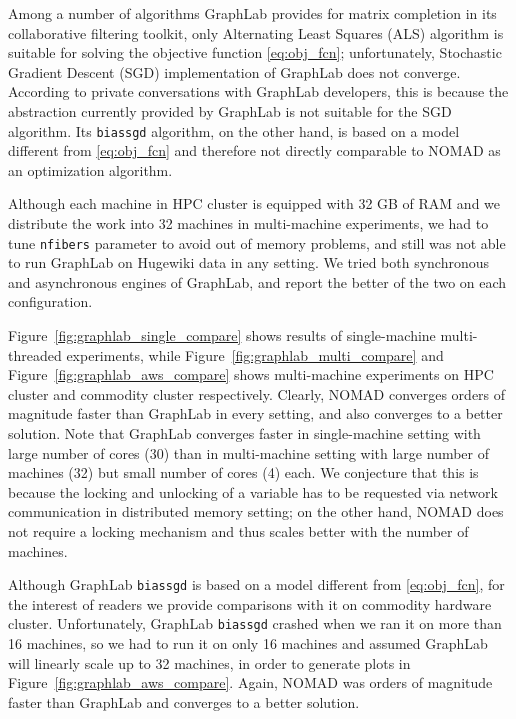 \documentclass{vldb}
\begin{document}
Among a number of algorithms GraphLab provides for matrix completion
in its collaborative filtering toolkit, only Alternating Least Squares
(ALS) algorithm is suitable for solving the objective function
\eqref{eq:obj_fcn}; unfortunately, Stochastic Gradient Descent (SGD)
implementation of GraphLab does not converge.  According to private
conversations with GraphLab developers, this is because the
abstraction currently provided by GraphLab is not suitable for the SGD
algorithm.  Its \texttt{biassgd} algorithm, on the other hand, is
based on a model different from \eqref{eq:obj_fcn} and therefore not
directly comparable to NOMAD as an optimization algorithm.


Although each machine in HPC cluster is equipped with 32 GB of RAM and
we distribute the work into 32 machines in multi-machine experiments,
we had to tune \texttt{nfibers} parameter to avoid out of memory
problems, and still was not able to run GraphLab on Hugewiki data in
any setting.  We tried both synchronous and asynchronous engines of
GraphLab, and report the better of the two on each configuration.

Figure~\ref{fig:graphlab_single_compare} shows results of
single-machine multi-threaded experiments, while
Figure~\ref{fig:graphlab_multi_compare} and
Figure~\ref{fig:graphlab_aws_compare} shows multi-machine experiments
on HPC cluster and commodity cluster respectively.  Clearly, NOMAD
converges orders of magnitude faster than GraphLab in every setting,
and also converges to a better solution.  Note that GraphLab converges
faster in single-machine setting with large number of cores (30) than
in multi-machine setting with large number of machines (32) but small
number of cores (4) each.  We conjecture that this is because the
locking and unlocking of a variable has to be requested via network
communication in distributed memory setting; on the other hand, NOMAD
does not require a locking mechanism and thus scales better with the
number of machines.

Although GraphLab \texttt{biassgd} is based on a model different from
\eqref{eq:obj_fcn}, for the interest of readers we provide comparisons
with it on commodity hardware cluster.  Unfortunately, GraphLab
\texttt{biassgd} crashed when we ran it on more than 16 machines, so
we had to run it on only 16 machines and assumed GraphLab will
linearly scale up to 32 machines, in order to generate plots in
Figure~\ref{fig:graphlab_aws_compare}.  Again, NOMAD was orders of
magnitude faster than GraphLab and converges to a better solution.
\end{document}
